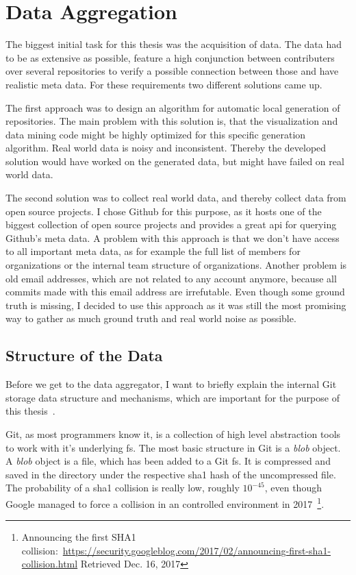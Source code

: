 \chapter{Data Aggregation}\label{data-aggregation}

The biggest initial task for this thesis was the acquisition of data.
The data had to be as extensive as possible, feature a high conjunction between contributers over several repositories to verify a possible connection between those and have realistic meta data.
For these requirements two different solutions came up.

The first approach was to design an algorithm for automatic local generation of repositories.
The main problem with this solution is, that the visualization and data mining code might be highly optimized for this specific generation algorithm.
Real world data is noisy and inconsistent. Thereby the developed solution would have worked on the generated data, but might have failed on real world data.

The second solution was to collect real world data, and thereby collect data from open source projects.
I chose Github for this purpose, as it hosts one of the biggest collection of open source projects and provides a great \ac{api} for querying Github's meta data.
A problem with this approach is that we don't have access to all important meta data, as for example the full list of members for organizations or the internal team structure of organizations.
Another problem is old email addresses, which are not related to any account anymore, because all commits made with this email address are irrefutable.
Even though some ground truth is missing, I decided to use this approach as it was still the most promising way to gather as much ground truth and real world noise as possible.


\section{Structure of the Data}

Before we get to the data aggregator, I want to briefly explain the internal Git storage data structure and mechanisms, which are important for the purpose of this thesis~\cite{book:pro-git}.

Git, as most programmers know it, is a collection of high level abstraction tools to work with it's underlying \ac{fs}.
The most basic structure in Git is a \emph{blob} object.
A \emph{blob} object is a file, which has been added to a Git \ac{fs}. It is compressed and saved in the  directory under the respective \ac{sha1} hash of the uncompressed file.
The probability of a \ac{sha1} collision is really low, roughly $10^{-45}$, even though Google managed to force a collision in an controlled environment in 2017~\footnote{Announcing the first SHA1 collision:~\url{https://security.googleblog.com/2017/02/announcing-first-sha1-collision.html} Retrieved Dec. 16, 2017}.

